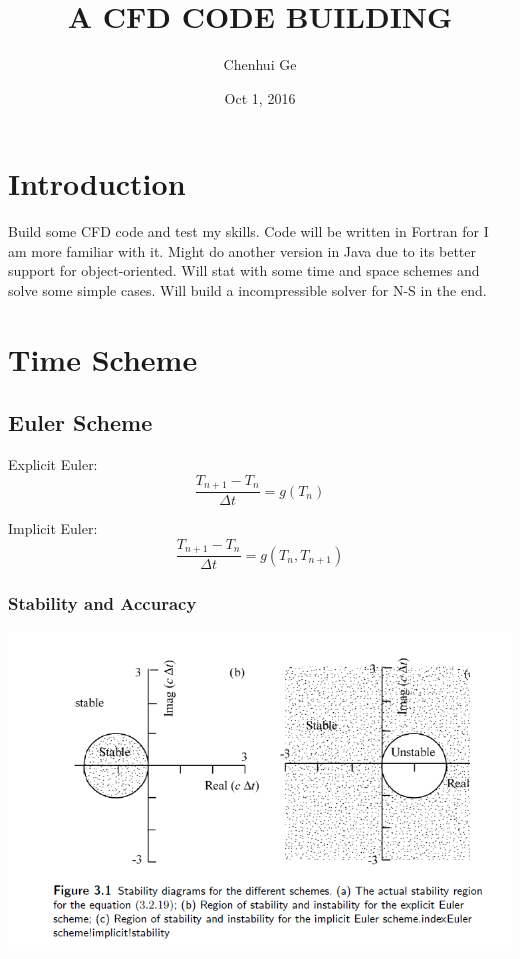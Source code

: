 \documentclass{article}
\title{A CFD CODE BUILDING}
\author{Chenhui Ge}
\date{Oct 1, 2016}
\begin{document}
\maketitle

\newpage

\section{Introduction}
Build some CFD code and test my skills. Code will be written in Fortran for I am more familiar with it. Might do another version in Java due to its better support for object-oriented.
Will stat with some time and space schemes and solve some simple cases. Will build a incompressible solver for N-S in the end.

\section{Time Scheme}
\subsection{Euler Scheme}
Explicit Euler:
\begin{equation}
\frac{T_{n+1}-T_{n}}{\Delta t}=g(T_n)
\end{equation}


Implicit Euler:
\begin{equation}
\frac{T_{n+1}-T_{n}}{\Delta t}=g(T_n,T_{n+1})
\end{equation}
\subsubsection{Stability and Accuracy}
\includegraphics{eulerstability}
\end{document}

